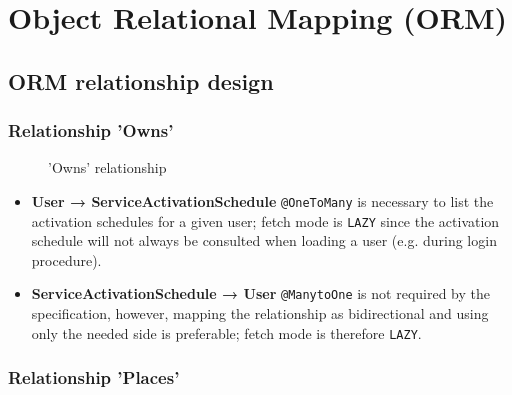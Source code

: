 
\chapter{Object Relational Mapping (ORM)}
\label{chap:orm}


\section{ORM relationship design}
\label{sec:rel_design}

\subsection*{Relationship 'Owns'}

\begin{minipage}[h]{0.5\textwidth}
    \begin{figure}[H]
        
        \caption{'Owns' relationship}
        \label{fig:orm_u_sac}
    \end{figure}
\end{minipage}
\hfill
\begin{minipage}[h]{0.48\textwidth}
    \begin{itemize}
        \item \textbf{User → ServiceActivationSchedule} \texttt{@OneToMany} is necessary to list the activation schedules for a given user; fetch mode is \texttt{LAZY} since the activation schedule will not always be consulted when loading a user (e.g. during login procedure).
        \item \textbf{ServiceActivationSchedule → User} \texttt{@ManytoOne} is not required by the specification, however, mapping the relationship as bidirectional and using only the needed side is preferable; fetch mode is therefore \texttt{LAZY}.
    \end{itemize}
\end{minipage}

\subsection*{Relationship 'Places'}

